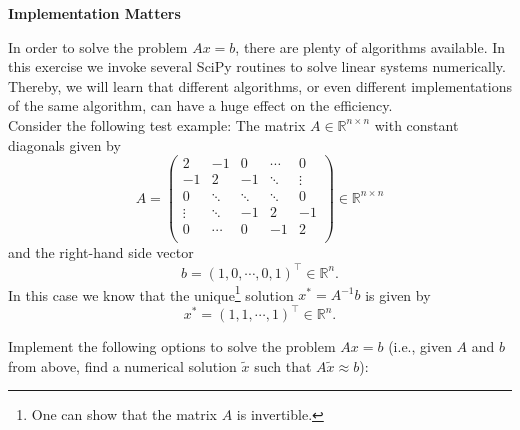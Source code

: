\textbf{Implementation Matters}

In order to solve the problem $Ax = b$, there are plenty of algorithms available. In this exercise we invoke several SciPy routines to solve linear systems numerically. Thereby, we will learn that different algorithms, or even different implementations of the same algorithm, can have a huge effect on the efficiency.\\

Consider the following test example:
The matrix $A \in \mathbb{R}^{n \times n}$ with constant diagonals given by 
$$A = \begin{pmatrix}
2 & -1 		& 0  &\cdots & 0\\
-1 & 2 		& -1  &\ddots &  \vdots\\
0 & \ddots  		&\ddots   	 &\ddots  & 0 \\
\vdots    & \ddots  		&-1  	 &2 & -1\\
0 & \cdots 	&  0  &-1 & 2\\
\end{pmatrix} \in \mathbb{R}^{n \times n}$$
and the right-hand side vector $$b = (1,0,\cdots,0,1)^\top \in \mathbb{R}^n.$$
In this case we know that the unique\footnote{One can show that the matrix $A$ is invertible.} solution $x^*=A^{-1}b$ is given by
$$x^* = (1,1,\cdots,1)^\top \in \mathbb{R}^n.$$

Implement the following options to solve the problem $Ax=b$ (i.e., given $A$ and $b$ from above, find a numerical solution $\tilde{x}$ such that $A\tilde{x}\approx b$):


